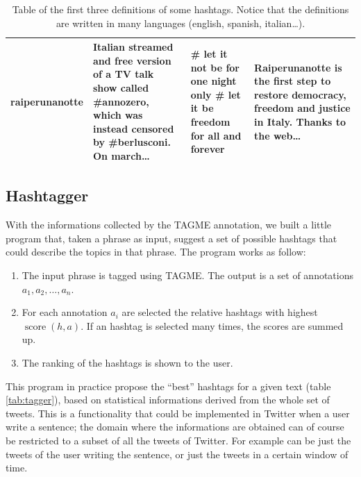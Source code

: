 \documentclass[a4paper,11pt,oneside]{article}
\DeclareMathOperator{\score}{score}
\begin{document}
\begin{table}[h]
\begin{tabular}{ | l | p{4cm} | p{4cm} | p{4cm} |}
raiperunanotte & \footnotesize{Italian streamed and free version of a TV talk show called \#annozero, which was instead censored by \#berlusconi. On march\dots} & \footnotesize{\# let it not be for one night only \# let it be freedom for all and forever} & \footnotesize{Raiperunanotte is the first step to restore democracy, freedom and justice in Italy. Thanks to the web\dots}\\
 \hline
    \end{tabular}
    \caption{Table of the first three definitions of some hashtags. Notice that the definitions are written in many languages (english, spanish, italian\dots).}
    \label{tab:hashDef}
\end{table}


\subsection{Hashtagger}
\label{sec:tagger}
With the informations collected by the TAGME annotation, we built a little program that, taken a phrase as input, suggest a set of possible hashtags that could describe the topics in that phrase.
The program works as follow:
\begin{enumerate}
\item The input phrase is tagged using TAGME. The output is a set of annotations $a_1, a_2,\ldots, a_n$.
\item For each annotation $a_i$ are selected the relative hashtags with highest $\score(h,a)$. If an hashtag is selected many times, the scores are summed up.
\item The ranking of the hashtags is shown to the user.
\end{enumerate}

This program in practice propose the ``best'' hashtags for a given text (table \ref{tab:tagger}), based on statistical informations derived from the whole set of tweets. This is a functionality that could be implemented in Twitter when a user write a sentence; the domain where the informations are obtained can of course be restricted to a subset of all the tweets of Twitter. For example  can be just the tweets of the user writing the sentence, or just the tweets in a certain window of time.  
\end{document}
